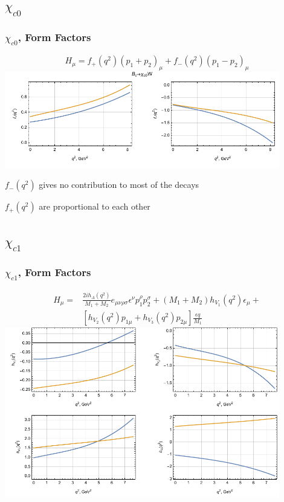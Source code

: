 \documentclass{beamer}
\begin{document}
\subsection{$\chi_{c0}$}
\begin{frame}
  \frametitle{$\chi_{c0}$, Form Factors}
  $$
  H_\mu = f_{+}\left(q^2\right) \left(p_1+p_2\right)_\mu + f_{-}\left(q^2\right) \left(p_1-p_2\right)_\mu 
  $$
  \includegraphics[width=0.9\textwidth]{figs/ff_chi_c0}

  $f_{-}(q^2)$ gives no contribution to most of the decays
  
  $f_{+}(q^2)$ are proportional to each other
\end{frame}


\subsection{$\chi_{c1}$}
\begin{frame}
  \frametitle{$\chi_{c1}$, Form Factors}
  \begin{align*}
    \label{eq:1}
    H_\mu =& \frac{2i h_A(q^2)}{M_1+M_2}e_{\mu\nu\rho\sigma}\epsilon^\nu p_1^\rho p_2^\sigma
             + (M_1+M_2) h_{V_1}(q^2)\epsilon_\mu + \\
     & [h_{V_2}(q^2)p_{1\mu} + h_{V_3}(q^2)p_{2\mu}]\frac{\epsilon q}{M_1}
  \end{align*}
  \includegraphics[width=0.9\textwidth]{figs/ff_chi_c1}
\end{frame}
\end{document}
